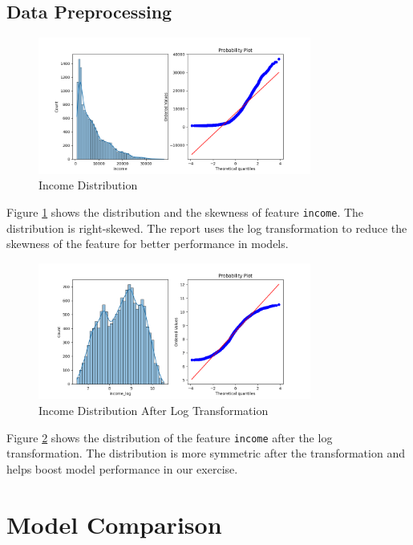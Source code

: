 \documentclass[10pt]{article} %
\begin{document}
    \subsection{Data Preprocessing}
    \begin{figure}
        \centering
        \includegraphics[width=0.8\textwidth]{"../fig/income_distribution.png"}
        \caption{Income Distribution}
        \label{fig:income_skew}
    \end{figure}
    Figure \ref{fig:income_skew} shows the distribution and the skewness of feature \texttt{income}. The distribution is right-skewed. The report uses the log transformation to reduce the skewness of the feature for better performance in models.
    \begin{figure}
        \centering
        \includegraphics[width=0.8\textwidth]{"../fig/income_distribution_log_transform.png"}
        \caption{Income Distribution After Log Transformation}
        \label{fig:income_log}
    \end{figure}

    Figure \ref{fig:income_log} shows the distribution of the feature \texttt{income} after the log transformation. The distribution is more symmetric after the transformation and helps boost model performance in our exercise.

\section{Model Comparison}
\end{document}
